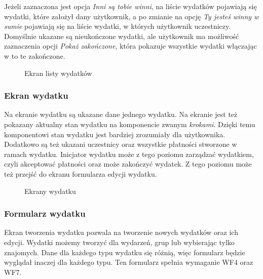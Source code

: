 Jeżeli zaznaczona jest opcja \emph{Inni są tobie winni}, na liście wydatków pojawiają się wydatki, które założył dany użytkownik, a po zmianie na opcję \emph{Ty jesteś winny w sumie} pojawiają się na liście wydatki, w których użytkownik uczestniczy. Domyślnie ukazane są nieukończone wydatki, ale użytkownik ma możliwość zaznaczenia opcji \emph{Pokaż zakończone}, która pokazuje wszystkie wydatki włączając w to te zakończone.

\begin{figure}[h]%
    \centering
    \caption{Ekran listy wydatków}%
\end{figure}

\clearpage
\subsubsection{Ekran wydatku}
Na ekranie wydatku są ukazane dane jednego wydatku. Na ekranie jest też pokazany aktualny stan wydatku na komponencie zwanym \emph{krokami}. Dzięki temu komponentowi stan wydatku jest bardziej zrozumiały dla użytkownika. Dodatkowo są też ukazani uczestnicy oraz wszystkie płatności stworzone w ramach wydatku. Inicjator wydatku może z tego poziomu zarządzać wydatkiem, czyli akceptować płatności oraz może zakończyć wydatek. Z tego poziomu może też przejść do ekranu formularza edycji wydatku.

\begin{figure}[h!]%
    \centering
    \qquad
    \qquad
    \qquad
    \caption{Ekrany wydatku}%
\end{figure}

\clearpage
\subsubsection{Formularz wydatku}
Ekran tworzenia wydatku pozwala na tworzenie nowych wydatków oraz ich edycji. Wydatki możemy tworzyć dla wydarzeń, grup lub wybierając tylko znajomych. Dane dla każdego typu wydatku się różnią, więc formularz będzie wyglądał inaczej dla każdego typu. Ten formularz spełnia wymaganie WF4 oraz WF7.


